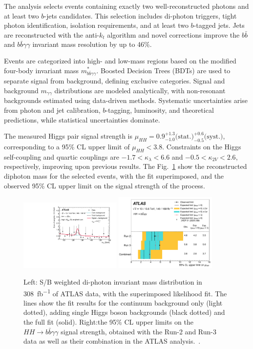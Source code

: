 \documentclass[a4paper,11pt]{article}
\begin{document}
The analysis selects events containing exactly two well-reconstructed
photons and at least two $b$-jets candidates.  This selection includes
di-photon triggers, tight photon identification, isolation
requirements, and at least two $b$-tagged jets. Jets are reconstructed
with the anti-$k_t$ algorithm and novel corrections improve the $b\bar{b}$ and
$b\bar{b}\gamma\gamma$ invariant mass resolution by up to 46\%.

Events are categorized into high- and low-mass regions based on the
modified four-body invariant mass
$m^*_{b\bar{b}\gamma\gamma}$. Boosted Decision Trees (BDTs) are used
to separate signal from background, defining exclusive
categories. Signal and background $m_{\gamma\gamma}$ distributions are
modeled analytically, with non-resonant backgrounds estimated using
data-driven methods. Systematic uncertainties arise from photon and
jet calibration, $b$-tagging, luminosity, and theoretical predictions,
while statistical uncertainties dominate.

The measured Higgs pair signal strength is
$\mu_{HH}=0.9^{+1.3}_{-1.0}\text{(stat.)}^{+0.6}_{-0.5}\text{(syst.)}$,
corresponding to a 95\% CL upper limit of $\mu_{HH}<3.8$. Constraints
on the Higgs self-coupling and quartic couplings are $-1.7 <
\kappa_\lambda < 6.6$ and $-0.5 < \kappa_{2V} < 2.6$, respectively,
improving upon previous results. The Fig.~\ref{fig:hhbbgg-atlas} show
the reconstructed diphoton mass for the selected events, with the fit
superimposed, and the observed 95\% CL upper limit on the signal
strength of the process.

\begin{figure}[!tbp]
\centering
\includegraphics[width=0.45\textwidth]{hhbbgg-mass-atlas}
\includegraphics[width=0.45\textwidth]{hhbbgg-ul-atlas}
\caption
    {Left: S/B weighted di-photon invariant mass distribution in
      \SI{308}{fb^{-1}} of ATLAS data, with the superimposed
      likelihood fit. The lines show the fit results for the continuum
      background only (light dotted), adding single Higgs boson
      backgrounds (black dotted) and the full fit (solid). Right:the
      95\% CL upper limits on the $HH\to b\bar b\gamma\gamma$ signal
      strength, obtained with the Run-2 and Run-3 data as well as
      their combination in the ATLAS
      analysis.~\cite{hhbbgg-atlas}.\label{fig:hhbbgg-atlas} }
\end{figure}
\end{document}
